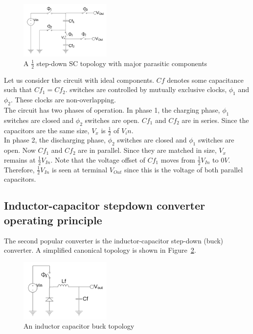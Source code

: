 \documentclass[letterpaper,twocolumn,10pt]{article}
\begin{document}
\begin{figure}[here]
\includegraphics[width=0.4\textwidth]{SCTopology}
\caption{A $\frac{1}{2}$ step-down SC topology with major parasitic components}
\label{SCTopology}
\end{figure}

Let us consider the circuit with ideal components. $Cf$ denotes some capacitance such that $Cf_1 = Cf_2$. switches are controlled by mutually exclusive clocks, $\phi_1$ and $\phi_2$. These clocks are non-overlapping.\\
The circuit has two phases of operation. In phase 1, the charging phase, $\phi_1$ switches are closed and $\phi_2$ switches are open. $Cf_1$ and $Cf_2$ are in series. Since the capacitors are the same size, $V_x$ is $\frac{1}{2}$ of $V_in$.\\
In phase 2, the discharging phase, $\phi_2$ switches are closed and $\phi_1$ switches are open. Now $Cf_1$ and $Cf_2$ are in parallel. Since they are matched in size, $V_x$ remains at $\frac{1}{2} V_{In}$. Note that the voltage offset of $Cf_1$ moves from $\frac{1}{2} V_{In}$ to $0V$. Therefore, $\frac{1}{2} V_{In}$ is seen at terminal $V_{Out}$ since this is the voltage of both parallel capacitors.\\

\subsection{Inductor-capacitor stepdown converter operating principle}

The second popular converter is the inductor-capacitor step-down (buck) converter. A simplified canonical topology is shown in Figure~\ref{BKTopology}.\\
\begin{figure}[here]
\includegraphics[width=0.4\textwidth]{BKTopology}
\caption{An inductor capacitor buck topology}
\label{BKTopology}
\end{figure}
\end{document}
